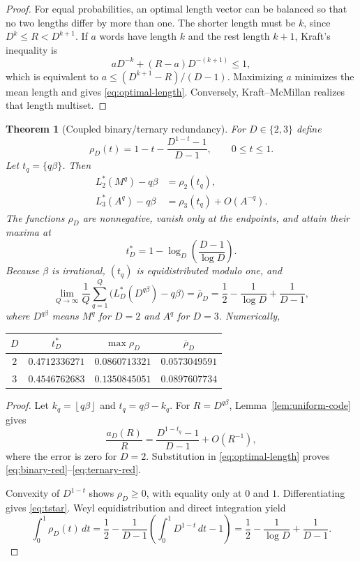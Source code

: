 \documentclass[11pt,oneside]{article}
\newtheorem{theorem}{Theorem}[section]
\theoremstyle{definition}
\theoremstyle{remark}
\newcommand{\floor}[1]{\left\lfloor #1\right\rfloor}
\begin{document}
\begin{proof}
For equal probabilities, an optimal length vector can be balanced so that no two lengths differ by more than one.  The shorter length must be $k$, since $D^k\leq R<D^{k+1}$.  If $a$ words have length $k$ and the rest length $k+1$, Kraft's inequality is
\[
 aD^{-k}+(R-a)D^{-(k+1)}\leq1,
\]
which is equivalent to $a\leq(D^{k+1}-R)/(D-1)$.  Maximizing $a$ minimizes the mean length and gives \eqref{eq:optimal-length}.  Conversely, Kraft--McMillan realizes that length multiset.
\end{proof}

\begin{theorem}[Coupled binary/ternary redundancy]\label{thm:prefix}
For $D\in\{2,3\}$ define
\begin{equation}\label{eq:rhoD}
 \rho_D(t)=1-t-\frac{D^{1-t}-1}{D-1},\qquad 0\leq t\leq1.
\end{equation}
Let $t_q=\{q\beta\}$.  Then
\begin{align}
 L_2^*(M^q)-q\beta&=\rho_2(t_q),\label{eq:binary-red}\\
 L_3^*(A^q)-q\beta&=\rho_3(t_q)+O(A^{-q}).\label{eq:ternary-red}
\end{align}
The functions $\rho_D$ are nonnegative, vanish only at the endpoints, and attain their maxima at
\begin{equation}\label{eq:tstar}
 t_D^*=1-\log_D\left(\frac{D-1}{\log D}\right).
\end{equation}
Because $\beta$ is irrational, $(t_q)$ is equidistributed modulo one, and
\begin{equation}\label{eq:mean-red}
 \lim_{Q\to\infty}\frac1Q\sum_{q=1}^Q
   \bigl(L_D^*(D^{q\beta})-q\beta\bigr)
 =\overline\rho_D
 =\frac12-\frac1{\log D}+\frac1{D-1},
\end{equation}
where $D^{q\beta}$ means $M^q$ for $D=2$ and $A^q$ for $D=3$.
Numerically,
\begin{center}
\begin{tabular}{cccc}
\toprule
$D$ & $t_D^*$ & $\max\rho_D$ & $\overline\rho_D$\\
\midrule
$2$ & $0.4712336271$ & $0.0860713321$ & $0.0573049591$\\
$3$ & $0.4546762683$ & $0.1350845051$ & $0.0897607734$\\
\bottomrule
\end{tabular}
\end{center}
\end{theorem}

\begin{proof}
Let $k_q=\floor{q\beta}$ and $t_q=q\beta-k_q$.  For $R=D^{q\beta}$, Lemma~\ref{lem:uniform-code} gives
\[
 \frac{a_D(R)}{R}
 =\frac{D^{1-t_q}-1}{D-1}+O(R^{-1}),
\]
where the error is zero for $D=2$.  Substitution in \eqref{eq:optimal-length} proves \eqref{eq:binary-red}--\eqref{eq:ternary-red}.

Convexity of $D^{1-t}$ shows $\rho_D\geq0$, with equality only at $0$ and $1$.  Differentiating gives \eqref{eq:tstar}.  Weyl equidistribution \cite{KuipersNiederreiter1974} and direct integration yield
\[
 \int_0^1\rho_D(t)\,dt
 =\frac12-\frac{1}{D-1}
   \left(\int_0^1D^{1-t}\,dt-1\right)
 =\frac12-\frac1{\log D}+\frac1{D-1}.
\]
\end{proof}
\end{document}

